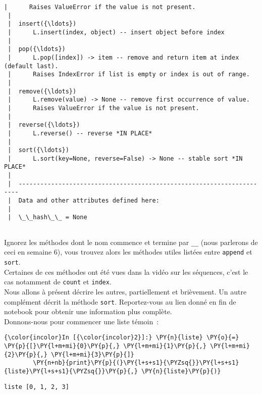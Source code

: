 \begin{Verbatim}[commandchars=\\\{\}]
 |      Raises ValueError if the value is not present.
 |  
 |  insert({\ldots})
 |      L.insert(index, object) -- insert object before index
 |  
 |  pop({\ldots})
 |      L.pop([index]) -> item -- remove and return item at index (default last).
 |      Raises IndexError if list is empty or index is out of range.
 |  
 |  remove({\ldots})
 |      L.remove(value) -> None -- remove first occurrence of value.
 |      Raises ValueError if the value is not present.
 |  
 |  reverse({\ldots})
 |      L.reverse() -- reverse *IN PLACE*
 |  
 |  sort({\ldots})
 |      L.sort(key=None, reverse=False) -> None -- stable sort *IN PLACE*
 |  
 |  ----------------------------------------------------------------------
 |  Data and other attributes defined here:
 |  
 |  \_\_hash\_\_ = None


    \end{Verbatim}

    Ignorez les méthodes dont le nom commence et termine par \texttt{\_\_}
(nous parlerons de ceci en semaine 6), vous trouvez alors les méthodes
utiles listées entre \texttt{append} et \texttt{sort}.\\

Certaines de ces méthodes ont été vues dans la vidéo sur les séquences,
c'est le cas notamment de \texttt{count} et \texttt{index}.\\

    Nous allons à présent décrire les autres, partiellement et brièvement.
Un autre complément décrit la méthode \texttt{sort}. Reportez-vous au
lien donné en fin de notebook pour obtenir une information plus
complète.\\

    Donnons-nous pour commencer une liste témoin~:

    \begin{Verbatim}[commandchars=\\\{\}]
{\color{incolor}In [{\color{incolor}2}]:} \PY{n}{liste} \PY{o}{=} \PY{p}{[}\PY{l+m+mi}{0}\PY{p}{,} \PY{l+m+mi}{1}\PY{p}{,} \PY{l+m+mi}{2}\PY{p}{,} \PY{l+m+mi}{3}\PY{p}{]}
        \PY{n+nb}{print}\PY{p}{(}\PY{l+s+s1}{\PYZsq{}}\PY{l+s+s1}{liste}\PY{l+s+s1}{\PYZsq{}}\PY{p}{,} \PY{n}{liste}\PY{p}{)}
\end{Verbatim}


    \begin{Verbatim}[commandchars=\\\{\}]
liste [0, 1, 2, 3]

    \end{Verbatim}

